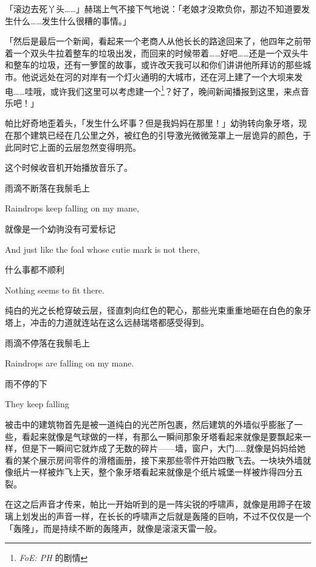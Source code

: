 「滚边去死丫头……」赫瑞上气不接下气地说：「老娘才没欺负你，那边不知道要发生什么……发生什么很糟的事情。」

「{\rt 然后是最后一个新闻，看起来一个老商人从他长长的路途回来了，他四年之前带着一个双头牛拉着整车的垃圾出发，而回来的时候带着……好吧……还是一个双头牛和整车的垃圾，还有一箩筐的故事，或许改天我可以和你们讲讲他所拜访的那些城市。他说远处在河的对岸有一个灯火通明的大城市，还在河上建了一个大坝来发电……哇哦，或许我们这里可以考虑建一个\footnote{\emph{FoE: PH} 的剧情}？好了，晚间新闻播报到这里，来点音乐吧！}」

帕比好奇地歪着头，「发生什么坏事？但是我妈妈在那里！」幼驹转向象牙塔，现在那个建筑已经在几公里之外，被红色的引导激光微微笼罩上一层诡异的颜色，于此同时它上面的云层忽然变得明亮。

这个时候收音机开始播放音乐了。

\begin{song}
雨滴不断落在我鬃毛上

Raindrops keep falling on my mane,

\medskip

就像是一个幼驹没有可爱标记

And just like the foal whose cutie mark is not there,

\medskip

什么事都不顺利

Nothing seems to fit there.
\end{song}

纯白的光之长枪穿破云层，径直刺向红色的靶心，那些光束重重地砸在白色的象牙塔上，冲击的力道就连站在这么远赫瑞塔都感受得到。

\begin{song}
雨滴不停落在我鬃毛上

Raindrops are falling on my mane.

\medskip

雨不停的下

They keep falling
\end{song}

被击中的建筑物首先是被一道纯白的光芒所包裹，然后建筑的外墙似乎膨胀了一些，看起来就像是气球做的一样，有那么一瞬间那象牙塔看起来就像是要飘起来一样，但是下一瞬间它就炸成了无数的碎片——墙，窗户，大门……就像是妈妈给她看的某个展示房间零件的滑稽画册，接下来那些零件开始四散飞去。一块块外墙就像纸片一样被炸飞上天，整个象牙塔看起来就像是个纸片城堡一样被炸得四分五裂。

在这之后声音才传来，帕比一开始听到的是一阵尖锐的呼啸声，就像是用蹄子在玻璃上划发出的声音一样，在长长的呼啸声之后就是轰隆的巨响，不过不仅仅是一个「轰隆」，而是持续不断的轰隆声，就像是滚滚天雷一般。

